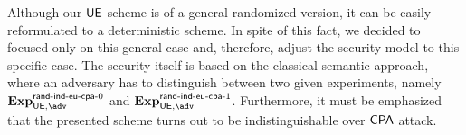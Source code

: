 \documentclass{fundam}
\begin{document}
\begin{pchstack}[center]
\begin{pcvstack}
		
		\pcvspace
		
		
		
	\end{pcvstack}
	
\end{pchstack}
\vspace{0.1cm}
Although our $\mathsf{UE}$ scheme is of a general randomized version, it can be easily reformulated to a deterministic scheme. In spite of this fact, we decided to focused only on this general case and, therefore, adjust the security model to this specific case. The security itself is based on the classical semantic approach, where an adversary  has to distinguish between two given experiments, namely $\Exp{\UE,\adv}{\EUmod{0}}$ and $\Exp{\UE,\adv}{\EUmod{1}}$. Furthermore, it must be emphasized that the presented scheme turns out to be indistinguishable over $\mathsf{CPA}$ attack.
\end{document}

